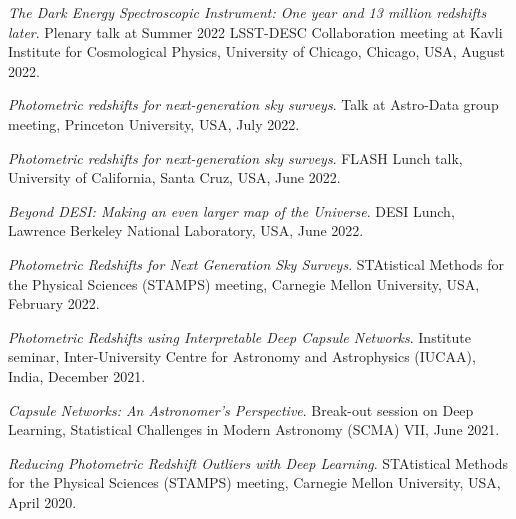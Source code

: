 \begin{etaremune}[leftmargin=40pt,labelsep=10pt]
    \item \textit{The Dark Energy Spectroscopic Instrument: One year and 13 million redshifts later}. Plenary talk at Summer 2022 LSST-DESC Collaboration meeting at Kavli Institute for Cosmological Physics, University of Chicago, Chicago, USA, August 2022.
    \item \textit{Photometric redshifts for next-generation sky surveys}. Talk at Astro-Data group meeting, Princeton University, USA, July 2022.
    \item \textit{Photometric redshifts for next-generation sky surveys}. FLASH Lunch talk, University of California, Santa Cruz, USA, June 2022.
    \item \textit{Beyond DESI: Making an even larger map of the Universe}. DESI Lunch, Lawrence Berkeley National Laboratory, USA, June 2022.
    \item \textit{Photometric Redshifts for Next Generation Sky Surveys}. STAtistical Methods for the Physical Sciences (STAMPS) meeting, Carnegie Mellon University, USA, February 2022.
    \item \textit{Photometric Redshifts using Interpretable Deep Capsule Networks}. Institute seminar, Inter-University Centre for Astronomy and Astrophysics (IUCAA), India,  December 2021.
     \item \textit{Capsule Networks: An Astronomer's Perspective}. Break-out session on Deep Learning, Statistical Challenges in Modern Astronomy (SCMA) VII,  June 2021.
    \item \textit{Reducing Photometric Redshift Outliers with Deep Learning}. STAtistical Methods for the Physical Sciences (STAMPS) meeting, Carnegie Mellon University, USA, April 2020.
\end{etaremune}
